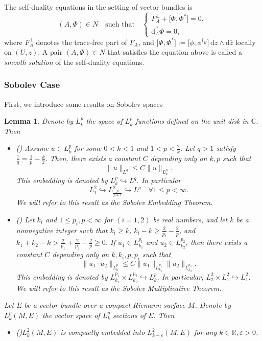 \documentclass[a4paper]{amsart}
\newtheorem{lemma}[theorem]{Lemma}
\theoremstyle{definition}
\theoremstyle{remark}
\numberwithin{equation}{section}
\begin{document}
The self-duality equations in the setting of vector bundles is
\[
(A, \Phi) \in N \quad \text{such that} \quad
\begin{cases}
F_A^{\perp} + \big[\Phi, \Phi^*\big] = 0, \\
\mathrm{d}_A^{\prime\prime} \Phi = 0,
\end{cases}
\]
where $F_A^{\perp}$ denotes the trace-free part of $F_A$, and $\big[\Phi, \Phi^*\big] := \big[\phi, \phi^{\dagger_H}\big] \, \mathrm{d}z \wedge \mathrm{d}\bar{z}$ locally on $(U,z)$. A pair $(A, \Phi) \in N$ that satisfies the equation above is called a \textit{smooth solution} of the self-duality equations.

\subsubsection{Sobolev Case}
First, we introduce some results on Sobolev spaces
\begin{lemma}\label{Sob property}
Denote by $L_k^p$ the space of $L_k^p$ functions defined on the unit disk in $\mathbb{C}$. Then
\begin{itemize}

    \item[$(1)$] \rm{(\cite[Theorem~6.7]{di2012hitchhikers})} Assume $u \in L_k^p$ for some $0<k<1$ and $1 < p < \frac{2}{k}$. Let $q > 1$ satisfy $\frac{1}{q} = \frac{1}{p} - \frac{k}{2}$. Then, there exists a constant $C$ depending only on $k, p$ such that
\[
\|u\|_{L^q} \leq C \|u\|_{L_k^p}.
\]
This embedding is denoted by $L_k^p \hookrightarrow L^q$. In particular
\[
L_1^2 \hookrightarrow L_{\frac{p}{p+1}}^2 \hookrightarrow L^p\quad\forall1 \leq p < \infty.
\]
We will refer to this result as the \textit{Sobolev Embedding Theorem}.

    \item[$(2)$] \rm{(\cite[Theorem 6.1]{behzadan2021multiplication})} Let $k_i$ and $1 \leq p_i, p < \infty$ for $(i = 1, 2)$ be real numbers, and let $k$ be a nonnegative integer such that $k_i \geq k$, $k_i - k \geq \frac{2}{p_i} - \frac{2}{p}$, and $k_1 + k_2 - k > \frac{2}{p_1} + \frac{2}{p_2} - \frac{2}{p} \geq 0$. If $u_1 \in L_{k_1}^{p_1}$ and $u_2 \in L_{k_2}^{p_2}$, then there exists a constant $C$ depending only on $k, k_i, p, p_i$ such that 
\[
\|u_1 \cdot u_2\|_{L_k^p} \leq C \|u_1\|_{L_{k_1}^{p_1}} \|u_2\|_{L_{k_2}^{p_2}}.
\] 
This embedding is denoted by $L_{k_1}^{p_1} \times L_{k_2}^{p_2} \hookrightarrow L_k^p$. In particular, $L_2^2 \times L_1^2 \hookrightarrow L_1^2$. We will refer to this result as the \textit{Sobolev Multiplicative Theorem}.

\end{itemize}
Let $E$ be a vector bundle over a compact Riemann surface $M$. Denote by $L_k^p(M, E)$ the vector space of $L_k^p$ sections of $E$. Then
\begin{itemize}
    \item[$(3)$] {\rm (\cite[Chapter~4, Proposition~4.4]{taylorpartial})}$L_k^2(M, E)$ is compactly embedded into $L_{k-\varepsilon}^2(M, E)$ for any $k \in \mathbb{R}, \varepsilon>0$. 
\end{itemize}
\end{lemma}
\end{document}
